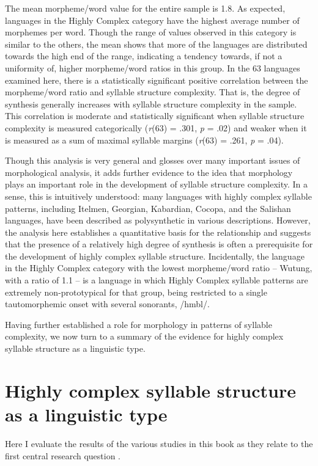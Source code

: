  The mean morpheme/word value for the entire sample is 1.8. As expected, languages in the Highly Complex category have the highest average number of morphemes per word. Though the range of values observed in this category is similar to the others, the mean shows that more of the languages are distributed towards the high end of the range, indicating a tendency towards, if not a uniformity of, higher morpheme/word ratios in this group. In the 63 languages examined here, there is a statistically significant positive correlation between the morpheme/word ratio and syllable structure complexity. That is, the degree of synthesis generally increases with syllable structure complexity in the sample. This correlation is moderate and statistically significant when syllable structure complexity is measured categorically (\textit{r}(63) = .301, \textit{p} = .02) and weaker when it is measured as a sum of maximal syllable margins (\textit{r}(63) = .261, \textit{p} = .04).

  Though this analysis is very general and glosses over many important issues of morphological analysis, it adds further evidence to the idea that morphology plays an important role in the development of syllable structure complexity. In a sense, this is intuitively understood: many languages with highly complex syllable patterns, including Itelmen, Georgian, Kabardian, Cocopa, and the Salishan languages, have been described as polysynthetic in various descriptions. However, the analysis here establishes a quantitative basis for the relationship and suggests that the presence of a relatively high degree of synthesis is often a prerequisite for the development of highly complex syllable structure. Incidentally, the language in the Highly Complex category with the lowest morpheme/word ratio -- Wutung, with a ratio of 1.1 -- is a language in which Highly Complex syllable patterns are extremely non-prototypical for that group, being restricted to a single tautomorphemic onset with several sonorants, /hmbl/.

  Having further established a role for morphology in patterns of syllable complexity, we now turn to a summary of the evidence for highly complex syllable structure as a linguistic type.

\section{Highly complex syllable structure as a linguistic type}\label{sec:8.3}

  Here I evaluate the results of the various studies in this book as they relate to the first central research question .

